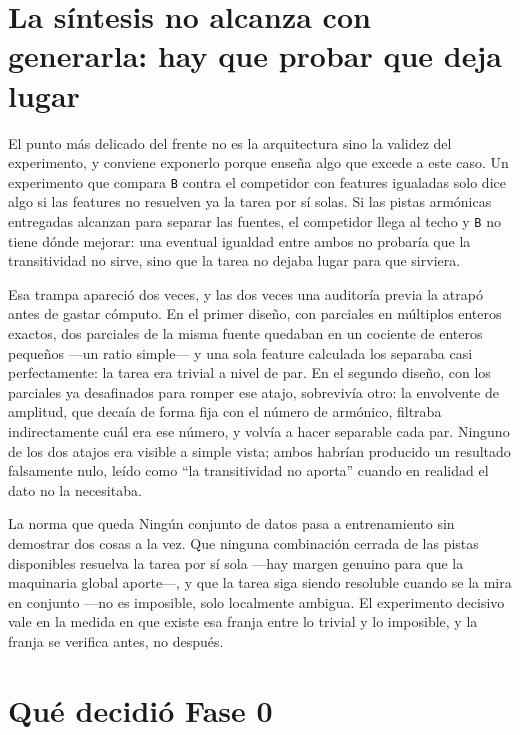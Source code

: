 \documentclass[11pt]{article}
\begin{document}
\section{La síntesis no alcanza con generarla: hay que probar que deja lugar}

El punto más delicado del frente no es la arquitectura sino la validez del experimento, y conviene exponerlo porque enseña algo que excede a este caso. Un experimento que compara \texttt{B} contra el competidor con features igualadas solo dice algo si las features no resuelven ya la tarea por sí solas. Si las pistas armónicas entregadas alcanzan para separar las fuentes, el competidor llega al techo y \texttt{B} no tiene dónde mejorar: una eventual igualdad entre ambos no probaría que la transitividad no sirve, sino que la tarea no dejaba lugar para que sirviera.

Esa trampa apareció dos veces, y las dos veces una auditoría previa la atrapó antes de gastar cómputo. En el primer diseño, con parciales en múltiplos enteros exactos, dos parciales de la misma fuente quedaban en un cociente de enteros pequeños —un ratio simple— y una sola feature calculada los separaba casi perfectamente: la tarea era trivial a nivel de par. En el segundo diseño, con los parciales ya desafinados para romper ese atajo, sobrevivía otro: la envolvente de amplitud, que decaía de forma fija con el número de armónico, filtraba indirectamente cuál era ese número, y volvía a hacer separable cada par. Ninguno de los dos atajos era visible a simple vista; ambos habrían producido un resultado falsamente nulo, leído como ``la transitividad no aporta'' cuando en realidad el dato no la necesitaba.

\begin{keybox}{La norma que queda}
Ningún conjunto de datos pasa a entrenamiento sin demostrar dos cosas a la vez. Que ninguna combinación cerrada de las pistas disponibles resuelva la tarea por sí sola —hay margen genuino para que la maquinaria global aporte—, y que la tarea siga siendo resoluble cuando se la mira en conjunto —no es imposible, solo localmente ambigua. El experimento decisivo vale en la medida en que existe esa franja entre lo trivial y lo imposible, y la franja se verifica antes, no después.
\end{keybox}

\section{Qué decidió Fase 0}
\end{document}
